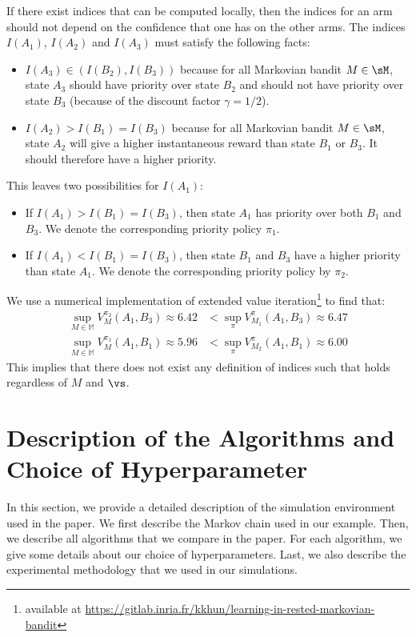 \begin{subappendices}
If there exist indices that can be computed locally, then the indices for an arm should not depend on the confidence that one has on the other arms. The indices $I(A_1)$, $I(A_2)$ and $I(A_3)$ must satisfy the following facts: 
\begin{itemize}
    \item $I(A_3)\in(I(B_2),I(B_3))$ because for all Markovian bandit $M\in\sM$, state $A_3$ should have priority over state $B_2$ and should not have priority over state $B_3$ (because of the discount factor $\gamma=1/2$).
    \item $I(A_2)>I(B_1)=I(B_3)$ because for all Markovian bandit $M\in\sM$, state $A_2$ will give a higher instantaneous reward than state $B_1$ or $B_3$. It should therefore have a higher priority.
\end{itemize}
This leaves two possibilities for $I(A_1)$: 
\begin{itemize}
\item If $I(A_1)>I(B_1)=I(B_3)$, then state $A_1$ has priority over both $B_1$ and $B_3$.  We denote the corresponding priority policy $\pi_1$.
\item If $I(A_1)<I(B_1)=I(B_3)$, then state $B_1$ and $B_3$ have a higher priority than state $A_1$. We denote the corresponding priority policy by $\pi_2$.
\end{itemize}  

We use a numerical implementation of extended value iteration\footnote{available at \url{https://gitlab.inria.fr/kkhun/learning-in-rested-markovian-bandit}} to find that:
\begin{align}
    \sup_{M\in\mathbb{M}} V^{\pi_2}_{M}(A_1,B_3) \approx 6.42
    &< \sup_{\pi}V^{\pi}_{M_1}(A_1,B_3) \approx 6.47 \label{eq:counter-example1}\\
    \sup_{M\in\mathbb{M}} V^{\pi_1}_{M}(A_1,B_1) \approx 5.96
    &< \sup_{\pi}V^{\pi}_{M_2}(A_1,B_1) \approx 6.00 \nonumber
\end{align}
This implies that there does not exist any definition of indices such that  holds regardless of $M$ and $\vs$. 

\section{Description of the Algorithms and Choice of Hyperparameter}
\label{apx:algos}

In this section, we provide a detailed description of the simulation environment used in the paper. We first describe the Markov chain used in our example. Then, we describe all algorithms that we compare in the paper. For each algorithm, we give some details about our choice of hyperparameters. Last, we also describe the experimental methodology that we used in our simulations. 


\end{subappendices}
